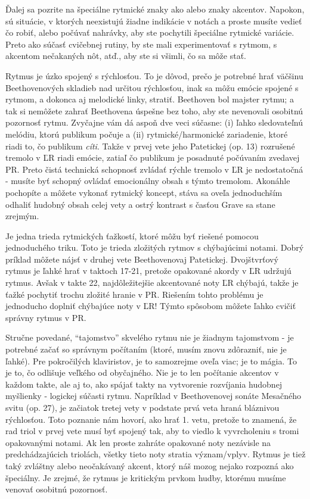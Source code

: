 Ďalej sa pozrite na špeciálne rytmické znaky ako  alebo znaky akcentov. Napokon, sú situácie, v ktorých neexistujú žiadne indikácie v notách a proste musíte vedieť čo robiť, alebo počúvať nahrávky, aby ste pochytili špeciálne rytmické variácie. Preto ako súčasť cvičebnej rutiny, by ste mali experimentovať s rytmom, s akcentom nečakaných nôt, atď., aby ste si všimli, čo sa môže stať.

Rytmus je úzko spojený s rýchlosťou. To je dôvod, prečo je potrebné hrať väčšinu Beethovenových skladieb nad určitou rýchlosťou, inak sa môžu emócie spojené s rytmom, a dokonca aj melodické linky, stratiť. Beethoven bol majster rytmu; a tak si nemôžete zahrať Beethovena úspešne bez toho, aby ste nevenovali osobitnú pozornosť rytmu. Zvyčajne vám dá aspoň dve veci súčasne: (i) ľahko sledovateľnú melódiu, ktorú publikum počuje a (ii) rytmické/harmonické zariadenie, ktoré riadi to, čo publikum \textit{cíti}. Takže v prvej vete jeho Patetickej (op. 13) rozrušené tremolo v ĽR riadi emócie, zatiaľ čo publikum je posadnuté počúvaním zvedavej PR. Preto čistá technická schopnosť zvládať rýchle tremolo v ĽR je nedostatočná - musíte byť schopný ovládať emocionálny obsah s týmto tremolom. Akonáhle pochopíte a môžete vykonať rytmický koncept, stáva sa oveľa jednoduchším odhaliť hudobný obsah celej vety a ostrý kontrast s časťou Grave sa stane zrejmým.

Je jedna trieda rytmických ťažkostí, ktoré môžu byť riešené pomocou jednoduchého triku. Toto je trieda zložitých rytmov s chýbajúcimi notami. Dobrý príklad môžete nájsť v druhej vete Beethovenovaj Patetickej. Dvojštvrťový rytmus je ľahké hrať v taktoch 17-21, pretože opakované akordy v ĽR udržujú rytmus. Avšak v takte 22, najdôležitejšie akcentované noty ĽR chýbajú, takže je ťažké pochytiť trochu zložité hranie v PR. Riešením tohto problému je jednoducho doplniť chýbajúce noty v ĽR! Týmto spôsobom môžete ľahko cvičiť správny rytmus v PR.

Stručne povedané, “tajomstvo” skvelého rytmu nie je žiadnym tajomstvom - je potrebné začať so správnym počítaním (ktoré, musím znovu zdôrazniť, nie je ľahké). Pre pokročilých klaviristov, je to samozrejme oveľa viac; je to mágia. To je to, čo odlišuje veľkého od obyčajného. Nie je to len počítanie akcentov v každom takte, ale aj to, ako spájať takty na vytvorenie rozvíjania hudobnej myšlienky - logickej súčasti rytmu. Napríklad v Beethovenovej sonáte Mesačného svitu (op. 27), je začiatok tretej vety v podstate prvá veta hraná bláznivou rýchlosťou. Toto poznanie nám hovorí, ako hrať 1. vetu, pretože to znamená, že rad triol v prvej vete musí byť spojený tak, aby to viedlo k vyvrcholeniu s tromi opakovanými notami. Ak len proste zahráte opakované noty nezávisle na predchádzajúcich triolách, všetky tieto noty stratia význam/vplyv. Rytmus je tiež taký zvláštny alebo neočakávaný akcent, ktorý náš mozog nejako rozpozná ako špeciálny. Je zrejmé, že rytmus je kritickým prvkom hudby, ktorému musíme venovať osobitnú pozornosť.

